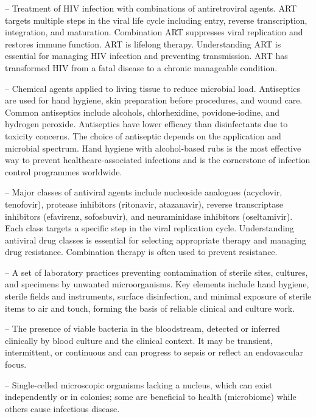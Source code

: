 -- Treatment of HIV infection with combinations of antiretroviral agents. ART targets multiple steps in the viral life cycle including entry, reverse transcription, integration, and maturation. Combination ART suppresses viral replication and restores immune function. ART is lifelong therapy. Understanding ART is essential for managing HIV infection and preventing transmission. ART has transformed HIV from a fatal disease to a chronic manageable condition.

-- Chemical agents applied to living tissue to reduce microbial load. Antiseptics are used for hand hygiene, skin preparation before procedures, and wound care. Common antiseptics include alcohols, chlorhexidine, povidone-iodine, and hydrogen peroxide. Antiseptics have lower efficacy than disinfectants due to toxicity concerns. The choice of antiseptic depends on the application and microbial spectrum. Hand hygiene with alcohol-based rubs is the most effective way to prevent healthcare-associated infections and is the cornerstone of infection control programmes worldwide.

-- Major classes of antiviral agents include nucleoside analogues (acyclovir, tenofovir), protease inhibitors (ritonavir, atazanavir), reverse transcriptase inhibitors (efavirenz, sofosbuvir), and neuraminidase inhibitors (oseltamivir). Each class targets a specific step in the viral replication cycle. Understanding antiviral drug classes is essential for selecting appropriate therapy and managing drug resistance. Combination therapy is often used to prevent resistance.

-- A set of laboratory practices preventing contamination of sterile sites, cultures, and specimens by unwanted microorganisms. Key elements include hand hygiene, sterile fields and instruments, surface disinfection, and minimal exposure of sterile items to air and touch, forming the basis of reliable clinical and culture work.

-- The presence of viable bacteria in the bloodstream, detected or inferred clinically by blood culture and the clinical context. It may be transient, intermittent, or continuous and can progress to sepsis or reflect an endovascular focus.

-- Single-celled microscopic organisms lacking a nucleus, which can exist independently or in colonies; some are beneficial to health (microbiome) while others cause infectious disease.

